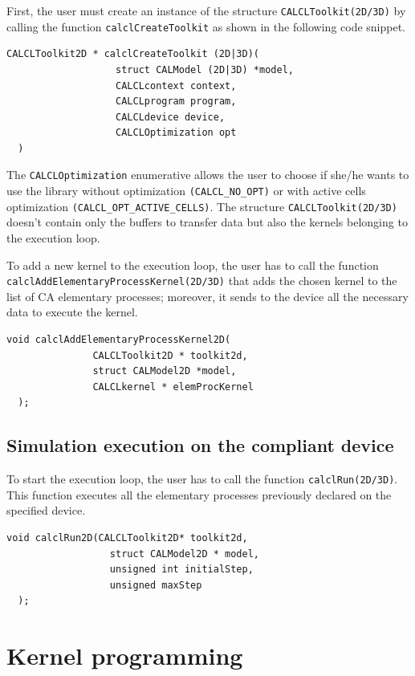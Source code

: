 First, the user must create an instance of the structure
\verb'CALCLToolkit(2D/3D)' by calling the function
\verb'calclCreateToolkit' as shown in the following code snippet.

\begin{lstlisting}[numbers=none]
  CALCLToolkit2D * calclCreateToolkit (2D|3D)(
                   struct CALModel (2D|3D) *model,
                   CALCLcontext context,
                   CALCLprogram program,
                   CALCLdevice device,
                   CALCLOptimization opt
  )
\end{lstlisting}

The \verb'CALCLOptimization' enumerative allows the user to choose if
she/he wants to use the library without optimization
\verb|(CALCL_NO_OPT)| or with active cells optimization
\verb|(CALCL_OPT_ACTIVE_CELLS)|. The structure
\verb'CALCLToolkit(2D/3D)' doesn't contain only the buffers to
transfer data but also the kernels belonging to the execution
loop.

To add a new kernel to the execution loop, the user has to
call the function \verb'calclAddElementaryProcessKernel(2D/3D)' that
adds the chosen kernel to the list of CA elementary processes;
moreover, it sends to the device all the necessary data to execute the
kernel.

\begin{lstlisting}[numbers=none]
  void calclAddElementaryProcessKernel2D(
               CALCLToolkit2D * toolkit2d,
               struct CALModel2D *model,
               CALCLkernel * elemProcKernel
  );
\end{lstlisting}


\subsection{Simulation execution on the compliant device}

To start the execution loop, the user has to call the function
\verb'calclRun(2D/3D)'. This function executes all the elementary
processes previously declared on the specified device.

\begin{lstlisting}[numbers=none]
  void calclRun2D(CALCLToolkit2D* toolkit2d,
                  struct CALModel2D * model,
                  unsigned int initialStep,
                  unsigned maxStep
  );
\end{lstlisting}


\section{Kernel programming}

